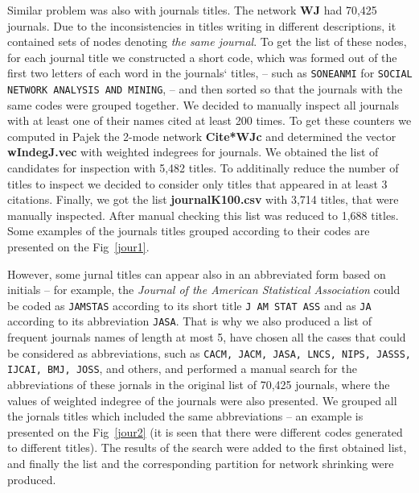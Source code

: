 \documentclass[11pt]{article} %
\begin{document}
Similar problem was also with journals titles. The network \textbf{WJ} had 70,425 journals. Due to the inconsistencies in titles writing in different descriptions, it contained sets of nodes denoting \textit{the same journal}. To get the list of these nodes, for each journal title we constructed a short code, which was formed out of the first two letters of each word in the journals` titles, -- such as \texttt{SONEANMI} for \texttt{SOCIAL NETWORK ANALYSIS AND MINING}, -- and then sorted so that the journals with the same codes were grouped together. We decided to manually inspect all journals with at least one of their names cited at least 200 times. To get these counters we computed in Pajek the 2-mode network \textbf{Cite*WJc} and determined the vector \textbf{wIndegJ.vec} with weighted indegrees for journals. We obtained the list of candidates for inspection with 5,482 titles. To additinally reduce the number of titles to inspect we decided to consider only titles that appeared in at least 3 citations. Finally, we got the list \textbf{journalK100.csv} with 3,714 titles, that were manually inspected. After manual checking this list was reduced to 1,688 titles. Some examples of the journals titles grouped according to their codes are presented on the Fig~\ref{jour1}.\medskip 

However, some jurnal titles can appear also in an abbreviated form based on initials -- for example, the \textit{Journal of the American Statistical Association} could be coded as \texttt{JAMSTAS} according to its short title \texttt{J AM  STAT ASS} and as \texttt{JA} according to its abbreviation \texttt{JASA}. That is why we also produced a list of frequent journals names of length at most 5, have chosen all the cases that could be considered as abbreviations, such as \texttt{CACM, JACM, JASA, LNCS, NIPS, JASSS, IJCAI, BMJ, JOSS}, and others, and performed a manual search for the abbreviations of these jornals in the original list of 70,425 journals, where the values of weighted indegree of the journals were also presented. We grouped all the jornals titles which included the same abbreviations -- an example  is presented on the Fig~\ref{jour2} (it is seen that there were different codes generated to different titles). The results of the search were added to the first obtained list, and finally the list and the corresponding partition for network shrinking were produced.  \medskip 
\end{document}
